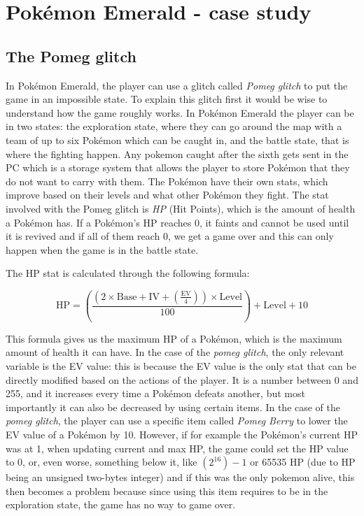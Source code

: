 \documentclass[a4paper]{usiinfbachelorproject}
\begin{document}
\section{\textbf{Pokémon Emerald - case study}}
\subsection{\textbf{The Pomeg glitch}}
In Pokémon Emerald, the player can use a glitch called \textit{Pomeg glitch} to put the game in an impossible state. To explain this glitch first it would be wise to understand how the game roughly works. In Pokémon Emerald the player can be in two states: the exploration state, where they can go around the map with a team of up to six Pokémon which can be caught in, and the battle state, that is where the fighting happen. Any pokemon caught after the sixth gets sent in the PC which is a storage system that allows the player to store Pokémon that they do not want to carry with them. The Pokémon have their own stats, which improve based on their levels and what other Pokémon they fight. The stat involved with the Pomeg glitch is \textit{HP} (Hit Points), which is the amount of health a Pokémon has. If a Pokémon's HP reaches 0, it faints and cannot be used until it is revived and if all of them reach 0, we get a game over and this can only happen when the game is in the battle state.

The HP stat is calculated through the following formula:

\[
	\text{HP} = \left( \frac{(2 \times \text{Base} + \text{IV} + \left( \frac{\text{EV}}{4} \right)) \times \text{Level}}{100} \right) + \text{Level} + 10
\]

This formula gives us the maximum HP of a Pokémon, which is the maximum amount of health it can have. In the case of the \textit{pomeg glitch}, the only relevant variable is the EV value: this is because the EV value is the only stat that can be directly modified based on the actions of the player. It is a number between 0 and 255, and it increases every time a Pokémon defeats another, but most importantly it can also be decreased by using certain items. In the case of the \textit{pomeg glitch}, the player can use a specific item called \textit{Pomeg Berry} to lower the EV value of a Pokémon by 10. However, if for example the Pokémon's current HP was at 1, when updating current and max HP, the game could set the HP value to 0, or, even worse, something below it, like $ (2^16)-1$ or 65535 HP (due to HP being an unsigned two-bytes integer) and if this was the only pokemon alive, this then becomes a problem because since using this item requires to be in the exploration state, the game has no way to game over.
\end{document}

